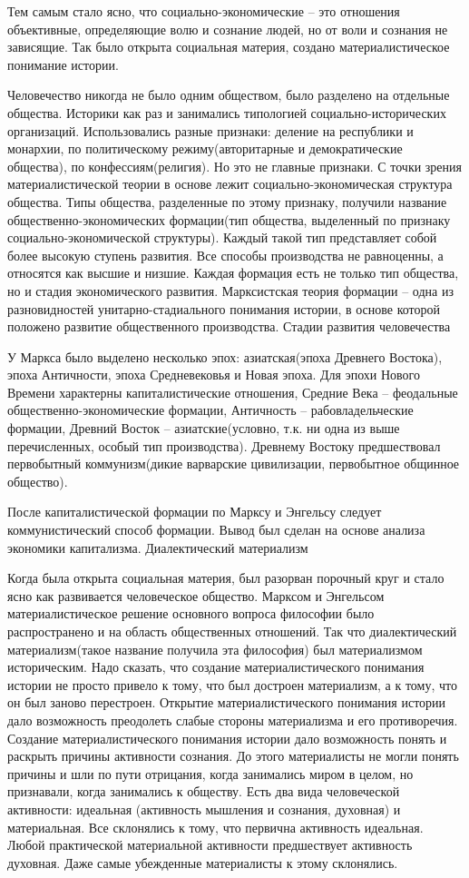 Тем самым стало ясно, что социально-экономические – это отношения объективные, определяющие волю и сознание людей, но от воли и сознания не зависящие. Так было открыта социальная материя, создано материалистическое понимание истории.

Человечество никогда не было одним обществом, было разделено на отдельные общества. Историки как раз и занимались типологией социально-исторических организаций. Использовались разные признаки: деление на республики и монархии, по политическому режиму(авторитарные и демократические общества), по конфессиям(религия). Но это не главные признаки. С точки зрения материалистической теории в основе лежит социально-экономическая структура общества. Типы общества, разделенные по этому признаку, получили название общественно-экономических формации(тип общества, выделенный по признаку социально-экономической структуры). Каждый такой тип представляет собой более высокую ступень развития. Все способы производства не равноценны, а относятся как высшие и низшие. Каждая формация есть не только тип общества, но и стадия экономического развития. Марксистская теория формации – одна из разновидностей унитарно-стадиального понимания истории, в основе которой положено развитие общественного производства.
Стадии развития человечества

У Маркса было выделено несколько эпох: азиатская(эпоха Древнего Востока), эпоха Античности, эпоха Средневековья и Новая эпоха. Для эпохи Нового Времени характерны капиталистические отношения, Средние Века – феодальные общественно-экономические формации, Античность – рабовладельческие формации, Древний Восток – азиатские(условно, т.к. ни одна из выше перечисленных, особый тип производства). Древнему Востоку предшествовал первобытный коммунизм(дикие варварские цивилизации, первобытное общинное общество).

После капиталистической формации по Марксу и Энгельсу следует коммунистический способ формации. Вывод был сделан на основе анализа экономики капитализма.
Диалектический материализм

Когда была открыта социальная материя, был разорван порочный круг и стало ясно как развивается человеческое общество. Марксом и Энгельсом материалистическое решение основного вопроса философии было распространено и на область общественных отношений. Так что диалектический материализм(такое название получила эта философия) был материализмом историческим. Надо сказать, что создание материалистического понимания истории не просто привело к тому, что был достроен материализм, а к тому, что он был заново перестроен. Открытие материалистического понимания истории дало возможность преодолеть слабые стороны материализма и его противоречия. Создание материалистического понимания истории дало возможность понять и раскрыть причины активности сознания. До этого материалисты не могли понять причины и шли по пути отрицания, когда занимались миром в целом, но признавали, когда занимались к обществу. Есть два вида человеческой активности: идеальная (активность мышления и сознания, духовная) и материальная. Все склонялись к тому, что первична активность идеальная. Любой практической материальной активности предшествует активность духовная. Даже самые убежденные материалисты к этому склонялись.

